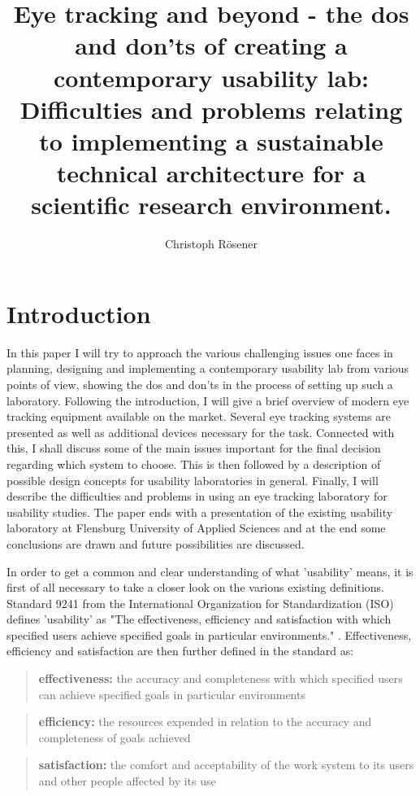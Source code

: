 \documentclass[output=paper]{langsci/langscibook}
\author{%
 Christoph Rösener
\affiliation{Johannes Gutenberg University of Mainz/Germersheim}
}
\title{Eye tracking and beyond - the dos and don'ts of creating a contemporary usability lab: {D}ifficulties and problems relating to implementing a sustainable technical architecture for a scientific research environment.}
\begin{document}
\section{Introduction}

In this paper I will try to approach the various challenging issues one faces in planning, designing and implementing a contemporary usability lab from various points of view, showing the dos and don'ts in the process of setting up such a laboratory. Following the introduction, I will give a brief overview of modern eye tracking equipment available on the market. Several eye tracking systems are presented as well as additional devices necessary for the task. Connected with this, I shall discuss some of the main issues important for the final decision regarding which system to choose. This is then followed by a description of possible design concepts for usability laboratories in general. Finally, I will describe the difficulties and problems in using an eye tracking laboratory for usability studies. The paper ends with a presentation of the existing usability laboratory at Flensburg University of Applied Sciences and at the end some conclusions are drawn and future possibilities are discussed.


In order to get a common and clear understanding of what 'usability' means, it is first of all necessary to take a closer look on the various existing definitions. Standard 9241 from the International Organization for Standardization (ISO) defines 'usability' as "The effectiveness, efficiency and satisfaction with which specified users achieve specified goals in particular environments." \citep{ISO9241}. Effectiveness, efficiency and satisfaction are then further defined in the standard as: 


\begin{quote}
\textbf{effectiveness: }the accuracy and completeness with which specified users can achieve specified goals in particular environments
\end{quote}

\begin{quote}
\textbf{efficiency:} the resources expended in relation to the accuracy and completeness of goals achieved
\end{quote}

\begin{quote}
\textbf{satisfaction:} the comfort and acceptability of the work system to its users and other people affected by its use
\end{quote}
\end{document}
